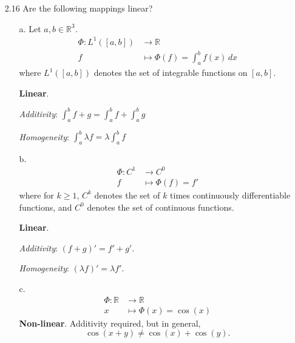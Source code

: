 \documentclass[11pt]{article}
\newcommand{\R}{\mathbb{R}}
\theoremstyle{definition}
\theoremstyle{plain}
\theoremstyle{remark}
\begin{document}
\begin{enumerate}
    \item[2.16] Are the following mappings linear?

          \begin{enumerate}
              \item[a.] Let $a, b \in \R^3$.
                    \[
                        \begin{aligned}
                            \Phi : L^1([a, b]) & \rightarrow \R                            \\
                            f                  & \mapsto \Phi(f) = \int_{a}^{b} f(x) \, dx
                        \end{aligned}
                    \]
                    where $L^1([a, b])$ denotes the set of integrable functions on $[a, b]$.

                    \textbf{Linear}.

                    \textit{Additivity}: $\int_{a}^{b} f + g = \int_{a}^{b} f + \int_{a}^{b} g $

                    \textit{Homogeneity}: $\int_{a}^{b} \lambda f = \lambda \int_{a}^{b} f $

              \item[b.]
                    \[
                        \begin{aligned}
                            \Phi : C^1 & \rightarrow C^0      \\
                            f          & \mapsto \Phi(f) = f'
                        \end{aligned}
                    \]
                    where for $k \geq 1$, $C^k$ denotes the set of $k$ times continuously differentiable
                    functions, and $C^0$ denotes the set of continuous functions.

                    \textbf{Linear}.

                    \textit{Additivity}: $(f + g)' = f' + g'$.

                    \textit{Homogeneity}: $(\lambda f)' = \lambda f'$.

              \item[c.]
                    \[
                        \begin{aligned}
                            \Phi : \R & \rightarrow \R            \\
                            x         & \mapsto \Phi(x) = \cos(x)
                        \end{aligned}
                    \]
                    \textbf{Non-linear}.  Additivity required, but in general,
                    \[
                        \cos(x + y) \neq \cos(x) + \cos(y).
                    \]


\end{enumerate}
\end{enumerate}
\end{document}
